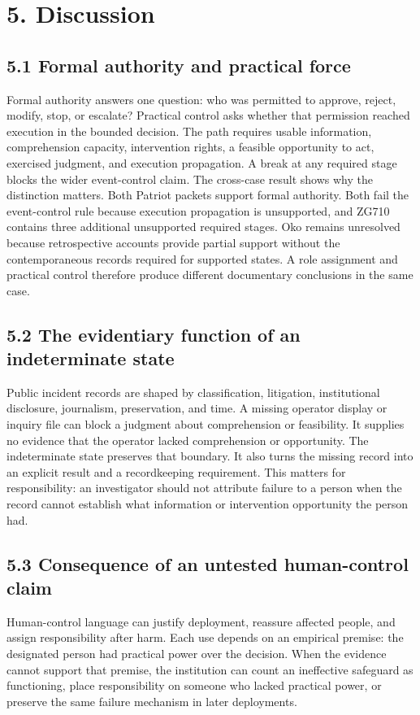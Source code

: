 \documentclass[11pt]{article}
\begin{document}
\section*{5. Discussion}
\subsection*{5.1 Formal authority and practical force}
Formal authority answers one question: who was permitted to approve, reject, modify, stop, or escalate? Practical control asks whether that permission reached execution in the bounded decision. The path requires usable information, comprehension capacity, intervention rights, a feasible opportunity to act, exercised judgment, and execution propagation. A break at any required stage blocks the wider event-control claim.
The cross-case result shows why the distinction matters. Both Patriot packets support formal authority. Both fail the event-control rule because execution propagation is unsupported, and ZG710 contains three additional unsupported required stages. Oko remains unresolved because retrospective accounts provide partial support without the contemporaneous records required for supported states. A role assignment and practical control therefore produce different documentary conclusions in the same case.
\subsection*{5.2 The evidentiary function of an indeterminate state}
Public incident records are shaped by classification, litigation, institutional disclosure, journalism, preservation, and time. A missing operator display or inquiry file can block a judgment about comprehension or feasibility. It supplies no evidence that the operator lacked comprehension or opportunity. The indeterminate state preserves that boundary. It also turns the missing record into an explicit result and a recordkeeping requirement. This matters for responsibility: an investigator should not attribute failure to a person when the record cannot establish what information or intervention opportunity the person had.
\subsection*{5.3 Consequence of an untested human-control claim}
Human-control language can justify deployment, reassure affected people, and assign responsibility after harm. Each use depends on an empirical premise: the designated person had practical power over the decision. When the evidence cannot support that premise, the institution can count an ineffective safeguard as functioning, place responsibility on someone who lacked practical power, or preserve the same failure mechanism in later deployments.
\end{document}
